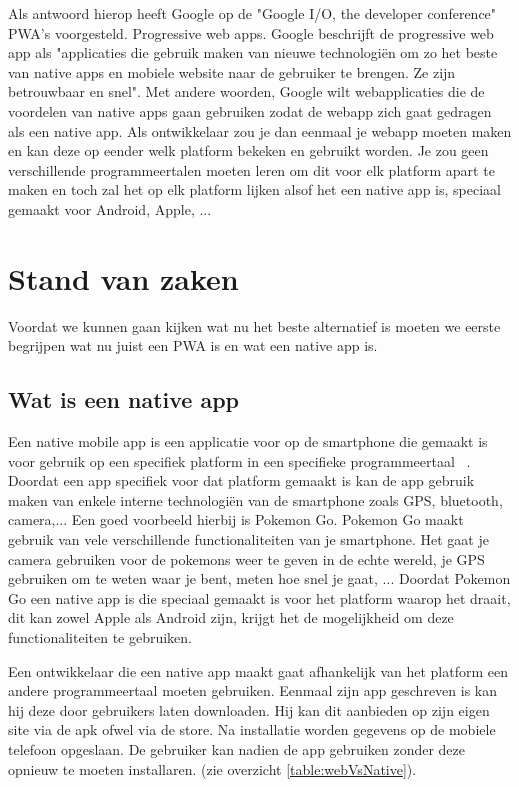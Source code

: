 Als antwoord hierop heeft Google op de "Google I/O, the developer conference" PWA's voorgesteld. Progressive web apps. Google beschrijft de progressive web app als "applicaties die gebruik maken van nieuwe technologiën om zo het beste van native apps en mobiele website naar de gebruiker te brengen. Ze zijn betrouwbaar en snel".
Met andere woorden, Google wilt webapplicaties die de voordelen van native apps gaan gebruiken zodat de webapp zich gaat gedragen als een native app. 
Als ontwikkelaar zou je dan eenmaal je webapp moeten maken en kan deze op eender welk platform bekeken en gebruikt worden. Je zou geen verschillende programmeertalen moeten leren om dit voor elk platform apart te maken en toch zal het op elk platform lijken alsof het een native app is, speciaal gemaakt voor Android, Apple, ...






\section{Stand van zaken}
\label{sec:stand-van-zaken}

Voordat we kunnen gaan kijken wat nu het beste alternatief is moeten we eerste begrijpen wat nu juist een PWA is en wat een native app is.

\subsection{Wat is een native app}
Een native mobile app is een applicatie voor op de smartphone die gemaakt is voor gebruik op een specifiek platform in een specifieke programmeertaal ~\autocite{mobileWat}. Doordat een app specifiek voor dat platform gemaakt is kan de app gebruik maken van enkele interne technologiën van de smartphone zoals GPS, bluetooth, camera,... Een goed voorbeeld hierbij is Pokemon Go. Pokemon Go maakt gebruik van vele verschillende functionaliteiten van je smartphone. Het gaat je camera gebruiken voor de pokemons weer te geven in de echte wereld, je GPS gebruiken om te weten waar je bent, meten hoe snel je gaat, ...  Doordat Pokemon Go een native app is die speciaal gemaakt is voor het platform waarop het draait, dit kan zowel Apple als Android zijn, krijgt het de mogelijkheid om deze functionaliteiten te gebruiken. 

Een ontwikkelaar die een native app maakt gaat afhankelijk van het platform een andere programmeertaal moeten gebruiken. Eenmaal zijn app geschreven is kan hij deze door gebruikers laten downloaden. Hij kan dit aanbieden op zijn eigen site via de apk ofwel via de store. Na installatie worden gegevens op de mobiele telefoon opgeslaan. De gebruiker kan nadien de app gebruiken zonder deze opnieuw te moeten installaren. (zie overzicht \ref{table:webVsNative}).


